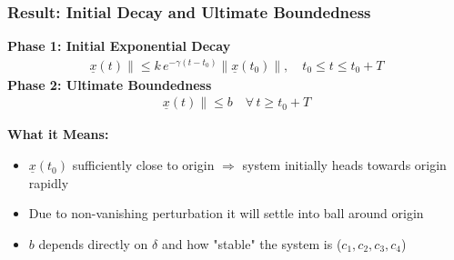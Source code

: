 \documentclass[student, noshadow, lsr, english, aspectratio=169, t]{ITR_LSR_slides}
\begin{document}
\begin{frame}
    \frametitle{Result: Initial Decay and Ultimate Boundedness}
	\vspace{-0.5cm}
	\begin{tcolorbox}[title=Outcome for any initial condition $\|\underline{x}(t_0)\| \leq \sqrt{c_1/c_2} \, r$]
		\textbf{Phase 1: Initial Exponential Decay}
		\begin{align*}
			\underline{x}(t)\| \leq k\, e^{-\gamma (t - t_0)} \|\underline{x}(t_0)\|, \quad t_0 \leq t \leq t_0 + T
		\end{align*}
		\textbf{Phase 2: Ultimate Boundedness}
		\begin{align*}
			\underline{x}(t)\| \leq b \quad \forall\, t \geq t_0 + T
		\end{align*}
	\end{tcolorbox}
    \vspace{0.3cm}
    \textbf{What it Means:}
    \begin{itemize}
        \item $\underline{x}(t_0)$ sufficiently close to origin $\Rightarrow$ system initially heads towards origin rapidly
        \item Due to non-vanishing perturbation it will settle into ball around origin
        \item $b$ depends directly on $\delta$ and how "stable" the system is ($c_1, c_2, c_3, c_4$)
    \end{itemize}

\end{frame}
\end{document}
